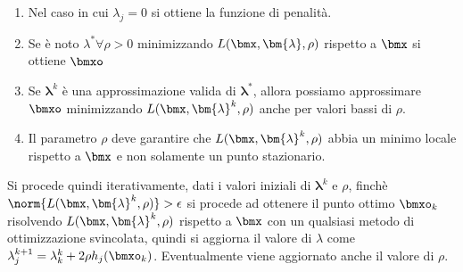 \documentclass[\main/main.tex]{subfiles}
\begin{document}
\begin{enumerate}
    \item Nel caso in cui \(\lambda_j=0\) si ottiene la funzione di penalità.
    \item Se è noto \(\lambda^* \forall \rho > 0\) minimizzando \(L(\bmx, \bm{\lambda}, \rho)\) rispetto a \(\bmx \) si ottiene \(\bmxo \)
    \item Se \(\bm{\lambda}^k\) è una approssimazione valida di \(\bm{\lambda}^*\), allora possiamo approssimare \(\bmxo \) minimizzando \(L(\bmx, \bm{\lambda}^k, \rho)\) anche per valori bassi di \(\rho \).
    \item Il parametro \(\rho \) deve garantire che \(L(\bmx, \bm{\lambda}^k, \rho)\) abbia un minimo locale rispetto a \(\bmx \) e non solamente un punto stazionario.
\end{enumerate}

Si procede quindi iterativamente, dati i valori iniziali di \(\bm{\lambda}^k\) e \(\rho \), finchè \(\norm{L(\bmx, \bm{\lambda}^k, \rho)} > \epsilon \) si procede ad ottenere il punto ottimo \(\bmxo_k\) risolvendo \(L(\bmx, \bm{\lambda}^k, \rho)\) rispetto a \(\bmx \) con un qualsiasi metodo di ottimizzazione svincolata, quindi si aggiorna il valore di \(\lambda \) come \(\lambda_j^{k+1} = \lambda_k^k + 2\rho h_j(\bmxo_k)\). Eventualmente viene aggiornato anche il valore di \(\rho \).

\clearpage
\end{document}
